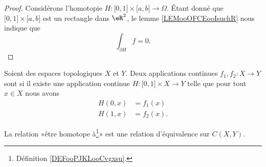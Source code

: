\begin{proof}
    Considérons l'homotopie \( H\colon \mathopen[ 0 , 1 \mathclose]\times \mathopen[ a , b \mathclose]\to \Omega\). Étant donné que \( \mathopen[ 0 ,1  \mathclose]\times \mathopen[ a , b \mathclose]\) est un rectangle dans \( \eR^2\), le lemme \ref{LEMooOFCEooIsuchR} nous indique que 
    \begin{equation}
        \int_{\partial H}f=0.
    \end{equation}
\end{proof}

\begin{definition}[homotopie]       \label{DEFooPJKLooCvgxsu}
    Soient des espaces topologiques \( X\) et \( Y\). Deux applications continues \( f_1,f_2\colon X\to Y\) sont  si il existe une application continue \( H\colon \mathopen[ 0 , 1 \mathclose]\times X\to Y \) telle que pour tout \( x\in X \) nous avons
    \begin{subequations}
        \begin{align}
            H(0,x)&=f_1(x)\\
            H(1,x)&=f_2(x).
        \end{align}
    \end{subequations}
\end{definition}

\begin{lemma}
    La relation «être homotope à\footnote{Définition \ref{DEFooPJKLooCvgxsu}.}»  est une relation d'équivalence sur \( C(X,Y)\).
\end{lemma}

